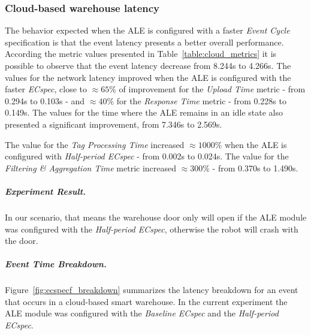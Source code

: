 \subsubsection{Cloud-based warehouse latency}
\label{subs:eval_exp_latency_ecspec_fast}
The behavior expected when the \gls{ALE} is configured with a faster \textit{Event Cycle} specification
is that the event latency presents a better overall performance. According the metric values presented
in Table~\ref{table:cloud_metrics} it is possible to observe that the event latency decrease from 8.244s
to 4.266s. The values for the network latency improved when the \gls{ALE} is configured with the faster
\textit{ECspec}, close to $\approx65\%$ of improvement for the \textit{Upload Time} metric - from 0.294s
to 0.103s - and $\approx40\%$ for the \textit{Response Time} metric - from 0.228s to 0.149s. The
values for the time where the \gls{ALE} remains in an idle state also presented a significant
improvement, from 7.346s to 2.569s.



The value for the \textit{Tag Processing Time} increased $\approx1000\%$ when the \gls{ALE} is configured
with \textit{Half-period ECspec} - from 0.002s to 0.024s. The value for the \textit{Filtering \& Aggregation Time}
metric increased $\approx300\%$ - from 0.370s to 1.490s.

\subparagraph{Experiment Result.}
\label{subp:cloud_experiment_result}
In our scenario, that means the warehouse door only will open if the \gls{ALE} module was configured
with the \textit{Half-period ECspec}, otherwise the robot will crash with the door.

\subparagraph{Event Time Breakdown.}
\label{subp:cloud_event_breakdown}
Figure~\ref{fig:ecspecf_breakdown} summarizes the latency breakdown for an event that occurs in a cloud-based
smart warehouse. In the current experiment the \gls{ALE} module was configured with the
\textit{Baseline ECspec} and the \textit{Half-period ECspec}.\\

